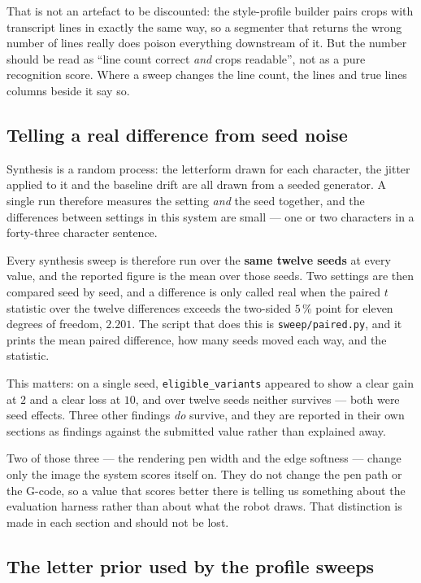 \documentclass[11pt,a4paper]{article}
\begin{document}
That is not an artefact to be discounted: the style-profile builder pairs crops
with transcript lines in exactly the same way, so a segmenter that returns the
wrong number of lines really does poison everything downstream of it. But the
number should be read as \enquote{line count correct \emph{and} crops readable},
not as a pure recognition score. Where a sweep changes the line count, the
\textsf{lines} and \textsf{true lines} columns beside it say so.

\subsection{Telling a real difference from seed noise}
\label{sec:paired}

Synthesis is a random process: the letterform drawn for each character, the
jitter applied to it and the baseline drift are all drawn from a seeded
generator. A single run therefore measures the setting \emph{and} the seed
together, and the differences between settings in this system are small --- one
or two characters in a forty-three character sentence.

Every synthesis sweep is therefore run over the \textbf{same twelve seeds} at
every value, and the reported figure is the mean over those seeds. Two settings
are then compared seed by seed, and a difference is only called real when the
paired $t$ statistic over the twelve differences exceeds the two-sided $5\,\%$
point for eleven degrees of freedom, $2.201$. The script that does this is
\texttt{sweep/paired.py}, and it prints the mean paired difference, how many
seeds moved each way, and the statistic.

This matters: on a single seed, \texttt{eligible\_variants} appeared to show a
clear gain at $2$ and a clear loss at $10$, and over twelve seeds neither
survives --- both were seed effects. Three other findings \emph{do} survive, and
they are reported in their own sections as findings against the submitted value
rather than explained away.

Two of those three --- the rendering pen width and the edge softness --- change
only the image the system scores itself on. They do not change the pen path or
the G-code, so a value that scores better there is telling us something about
the evaluation harness rather than about what the robot draws. That distinction
is made in each section and should not be lost.

\subsection{The letter prior used by the profile sweeps}
\label{sec:prior}
\end{document}
